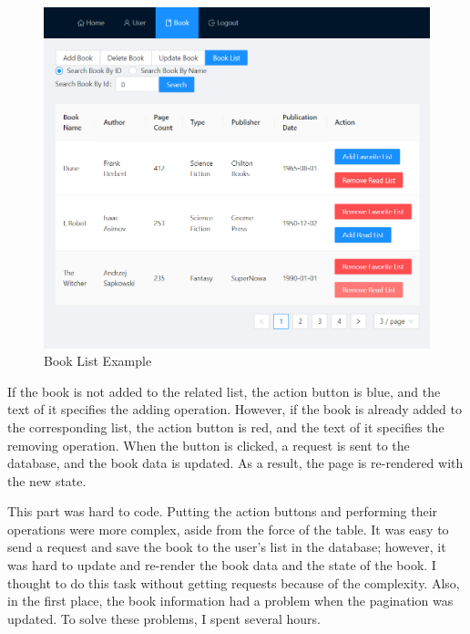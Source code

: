 \begin{minipage}{.49\textwidth}
  \begin{figure}[H]
    \centering
    \includegraphics[width=\linewidth]{img/front-end/book-list-example.png}
    \caption{Book List Example}
  \end{figure}
\end{minipage}
\newpage
If the book is not added to the related list, the action button is blue, and the text of it specifies the adding operation. However, if the book is already added to the corresponding list, the action button is red, and the text of it specifies the removing operation. When the button is clicked, a request is sent to the database, and the book data is updated. As a result, the page is re-rendered with the new state.

This part was hard to code. Putting the action buttons and performing their operations were more complex, aside from the force of the table. It was easy to send a request and save the book to the user's list in the database; however, it was hard to update and re-render the book data and the state of the book. I thought to do this task without getting requests because of the complexity. Also, in the first place, the book information had a problem when the pagination was updated. To solve these problems, I spent several hours.

